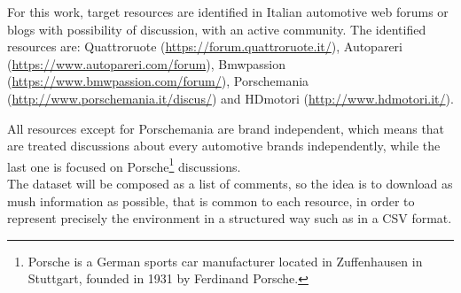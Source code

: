 For this work, target resources are identified in Italian automotive web forums or blogs with possibility of discussion, with an active community. The identified resources are: Quattroruote (\url{https://forum.quattroruote.it/}), Autopareri (\url{https://www.autopareri.com/forum}), Bmwpassion (\url{https://www.bmwpassion.com/forum/}), Porschemania (\url{http://www.porschemania.it/discus/}) and HDmotori (\url{http://www.hdmotori.it/}). 







All resources except for Porschemania are brand independent, which means that are treated discussions about every automotive brands independently, while the last one is focused on Porsche\footnote{Porsche is a German sports car manufacturer located in Zuffenhausen in Stuttgart, founded in 1931 by Ferdinand Porsche.} discussions.\\
The dataset will be composed as a list of comments, so the idea is to download as mush information as possible, that is common to each resource, in order to represent precisely the environment in a structured way such as in a \ac{CSV} format.

